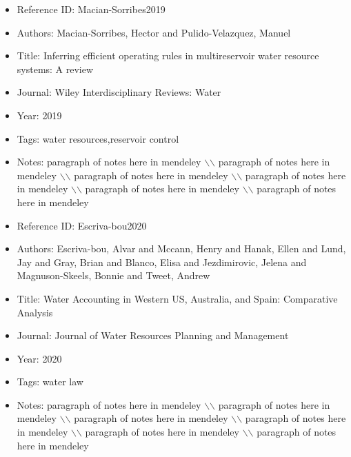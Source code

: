 \documentclass[11pt]{article}
\begin{document}
\noindent\citep{Macian-Sorribes2019} 
\begin{itemize} 
\item{Reference ID:  Macian-Sorribes2019} 

\item{Authors:  Macian-Sorribes, Hector and Pulido-Velazquez, Manuel} 

\item{Title:  Inferring efficient operating rules in multireservoir water resource systems: A review} 

\item{Journal:  Wiley Interdisciplinary Reviews: Water} 

\item{Year:  2019} 

\item{Tags:  water resources,reservoir control} 

\item{Notes:  paragraph of notes here in mendeley $\backslash$$\backslash$ paragraph of notes here in mendeley $\backslash$$\backslash$ paragraph of notes here in mendeley $\backslash$$\backslash$ paragraph of notes here in mendeley $\backslash$$\backslash$ paragraph of notes here in mendeley $\backslash$$\backslash$ paragraph of notes here in mendeley} 

\end{itemize}\medskip



\noindent\citep{Escriva-bou2020} 
\begin{itemize} 
\item{Reference ID:  Escriva-bou2020} 

\item{Authors:  Escriva-bou, Alvar and Mccann, Henry and Hanak, Ellen and Lund, Jay and Gray, Brian and Blanco, Elisa and Jezdimirovic, Jelena and Magnuson-Skeels, Bonnie and Tweet, Andrew} 

\item{Title:  Water Accounting in Western US, Australia, and Spain: Comparative Analysis} 

\item{Journal:  Journal of Water Resources Planning and Management} 

\item{Year:  2020} 

\item{Tags:  water law} 

\item{Notes:  paragraph of notes here in mendeley $\backslash$$\backslash$ paragraph of notes here in mendeley $\backslash$$\backslash$ paragraph of notes here in mendeley $\backslash$$\backslash$ paragraph of notes here in mendeley $\backslash$$\backslash$ paragraph of notes here in mendeley $\backslash$$\backslash$ paragraph of notes here in mendeley} 

\end{itemize}\medskip
\end{document}

